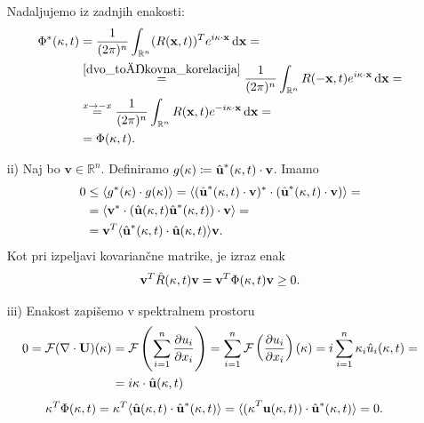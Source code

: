 \documentclass[mat2, tisk]{fmfdelo}
\newcommand{\R}{\mathbb R}
\newcommand{\bd}{\textbf}
\begin{document}
\begin{dokaz}
\begin{enumerate}
  Nadaljujemo iz zadnjih enakosti: 
  \begin{align*}
  \Phi^*(\text{\bd{$\kappa$}}, t) &= \frac{1}{(2\pi)^n} \int_{\R^n} ({R}(\bd{x}, t))^T e^{i\text{\bd{$\kappa$}} \cdot \bd{x}}\dif \bd{x} = \\
  &\stackrel{\ref{dvo_točkovna_korelacija}}{=} \frac{1}{(2\pi)^n} \int_{\R^n} {R}(-\bd{x}, t) e^{i\text{\bd{$\kappa$}} \cdot \bd{x}}\dif \bd{x} = \\
  &\stackrel{x\rightarrow -x}{=} \frac{1}{(2\pi)^n} \int_{\R^n} {R}(\bd{x}, t) e^{-i\text{\bd{$\kappa$}} \cdot \bd{x}}\dif \bd{x} = \\
  &= \Phi(\text{\bd{$\kappa$}}, t).
\end{align*}
\item[ii)] Naj bo $\bd{v} \in \R^n$. Definiramo $g(\text{\bd{$\kappa$}}) \coloneqq \hat{\bd{u}}^*(\text{\bd{$\kappa$}}, t) \cdot \bd{v}$.
Imamo 
\begin{align*} 
0 &\leq \langle g^*(\text{\bd{$\kappa$}}) \cdot g(\text{\bd{$\kappa$}}) \rangle = \langle (\hat{\bd{u}}^*(\text{\bd{$\kappa$}}, t) \cdot \bd{v})^* \cdot (\hat{\bd{u}}^*(\text{\bd{$\kappa$}}, t) \cdot \bd{v}) \rangle = \\
&= \langle \bd{v}^* \cdot(\hat{\bd{u}}(\text{\bd{$\kappa$}}, t) \hat{\bd{u}}^*(\text{\bd{$\kappa$}}, t)) \cdot \bd{v} \rangle = \\
&= \bd{v}^T\langle \hat{\bd{u}}^*(\text{\bd{$\kappa$}}, t) \cdot \hat{\bd{u}}(\text{\bd{$\kappa$}}, t) \rangle \bd{v}.
\end{align*}
Kot pri izpeljavi kovariančne matrike, je izraz enak 
\begin{align*}
\bd{v}^T \hat{R}(\text{\bd{$\kappa$}}, t) \bd{v} = \bd{v}^T \Phi(\text{\bd{$\kappa$}}, t) \bd{v} \geq 0.
\end{align*}
\item[iii)] Enakost zapišemo v spektralnem prostoru
\begin{align*}
  0 = \mathcal{F}(\nabla \cdot \bd{U})(\text{\bd{$\kappa$}}) &= \mathcal{F}\left(\sum_{i=1}^{n} \frac{\partial u_i}{\partial x_i} \right) = \sum_{i=1}^{n} \mathcal{F}\left(\frac{\partial u_i}{\partial x_i} \right)(\text{\bd{$\kappa$}}) = i\sum_{i=1}^{n} \text{\bd{$\kappa$}}_i \hat{u}_i(\text{\bd{$\kappa$}}, t) = \\
  &= i \text{\bd{$\kappa$}} \cdot \hat{\bd{u}}(\text{\bd{$\kappa$}}, t)
\end{align*}
\begin{align*}
\text{\bd{$\kappa$}}^T \Phi(\text{\bd{$\kappa$}}, t) &= \text{\bd{$\kappa$}}^T \langle \hat{\bd{u}}(\text{\bd{$\kappa$}}, t) \cdot \hat{\bd{u}}^*(\text{\bd{$\kappa$}}, t) \rangle = \langle \text{(\bd{$\kappa$}}^T \bd{u}(\text{\bd{$\kappa$}}, t)) \cdot \hat{\bd{u}}^*(\text{\bd{$\kappa$}}, t) \rangle = 0.

\end{align*}
\end{enumerate}
\end{dokaz}
\end{document}
